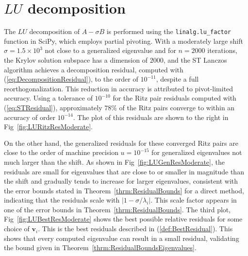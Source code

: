 \section{$LU$ decomposition}

The $LU$ decomposition of $A - \sigma B$ is performed using the \texttt{linalg.lu\_factor} function in SciPy, which employs partial pivoting. With a moderately large shift $\sigma = 1.5 \times 10^3$ not close to a generalized eigenvalue and for $n = 2000$ iterations, the Krylov solution subspace has a dimension of $2000$, and the ST Lanczos algorithm achieves a decomposition residual, computed with (\ref{eq:DecompositionResidual}), to the order of $10^{-11}$, despite a full reorthogonalization. This reduction in accuracy is attributed to pivot-limited accuracy. Using a tolerance of $10^{-10}$ for the Ritz pair residuals computed with (\ref{eq:STResidual}), approximately $78\%$ of the Ritz pairs converge to within an accuracy of order $10^{-14}$. The plot of this residuals are shown to the right in Fig~\ref{fig:LURitzResModerate}.

On the other hand, the generalized residuals for these converged Ritz pairs are close to the order of machine precision $u=10^{-15}$ for generalized eigenvalues not much larger than the shift. As shown in Fig~\ref{fig:LUGenResModerate}, the residuals are small for eigenvalues that are close to or smaller in magnitude than the shift and gradually tends to increase for larger eigenvalues, consistent with the error bounds stated in Theorem~\ref{thrm:ResidualBounds} for a direct method, indicating that the residuals scale with $\lvert 1-\sigma/\lambda_i \rvert$. This scale factor appears in one of the error bounds in Theorem~\ref{thrm:ResidualBounds}. The third plot, Fig~\ref{fig:LUBestResModerate} shows the best possible relative residuals for some choice of $\mathbf{v}_i$. This is the best residuals described in (\ref{def:BestResidual}). This shows that every computed eigenvalue can result in a small residual, validating the bound given in Theorem~\ref{thrm:ResidualBoundsEigenvalues}.

